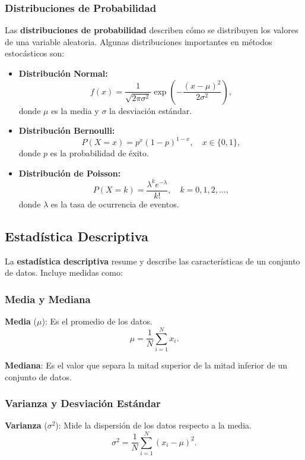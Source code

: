 \documentclass[12pt,a4,oneside]{book}
\begin{document}
	\subsubsection{Distribuciones de Probabilidad}
	
	Las \textbf{distribuciones de probabilidad} describen cómo se distribuyen los valores de una variable aleatoria. Algunas distribuciones importantes en métodos estocásticos son:
	
	\begin{itemize}
		\item \textbf{Distribución Normal:}  
		\[
		f(x) = \frac{1}{\sqrt{2\pi\sigma^2}} \exp\left(-\frac{(x-\mu)^2}{2\sigma^2}\right),
		\]
		donde \(\mu\) es la media y \(\sigma\) la desviación estándar.
		
		\item \textbf{Distribución Bernoulli:}  
		\[
		P(X=x) = p^x (1-p)^{1-x}, \quad x \in \{0,1\},
		\]
		donde \(p\) es la probabilidad de éxito.
		
		\item \textbf{Distribución de Poisson:}  
		\[
		P(X=k) = \frac{\lambda^k e^{-\lambda}}{k!}, \quad k = 0, 1, 2, \ldots,
		\]
		donde \(\lambda\) es la tasa de ocurrencia de eventos.
	\end{itemize}
	
	\subsection{Estadística Descriptiva}
	
	La \textbf{estadística descriptiva} resume y describe las características de un conjunto de datos. Incluye medidas como:
	
	\subsubsection{Media y Mediana}
	
	\textbf{Media} (\(\mu\)): Es el promedio de los datos.
	\[
	\mu = \frac{1}{N} \sum_{i=1}^N x_i.
	\]
	
	\textbf{Mediana}: Es el valor que separa la mitad superior de la mitad inferior de un conjunto de datos.
	
	\subsubsection{Varianza y Desviación Estándar}
	
	\textbf{Varianza} (\(\sigma^2\)): Mide la dispersión de los datos respecto a la media.
	\[
	\sigma^2 = \frac{1}{N} \sum_{i=1}^N (x_i - \mu)^2.
	\]
	
\end{document}
